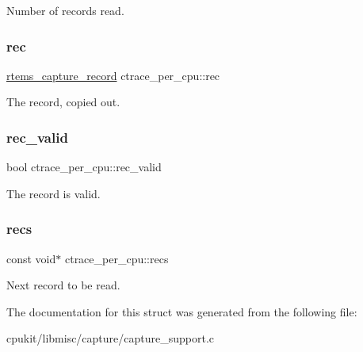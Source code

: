 Number of records read. \mbox{\label{structctrace__per__cpu_a23d0e1fac8bb2448b41de09fa07f5b1c}} 
\subsubsection{\texorpdfstring{rec}{rec}}
{\footnotesize\ttfamily \mbox{\hyperlink{structrtems__capture__record}{rtems\+\_\+capture\+\_\+record}} ctrace\+\_\+per\+\_\+cpu\+::rec}

The record, copied out. \mbox{\label{structctrace__per__cpu_a15bfce7ed37b3471213d39d3c6576d08}} 
\subsubsection{\texorpdfstring{rec\_valid}{rec\_valid}}
{\footnotesize\ttfamily bool ctrace\+\_\+per\+\_\+cpu\+::rec\+\_\+valid}

The record is valid. \mbox{\label{structctrace__per__cpu_ac22b798cd7df56f63d667365f11ff2fc}} 
\subsubsection{\texorpdfstring{recs}{recs}}
{\footnotesize\ttfamily const void$\ast$ ctrace\+\_\+per\+\_\+cpu\+::recs}

Next record to be read. 

The documentation for this struct was generated from the following file\+:\begin{DoxyCompactItemize}
\item 
cpukit/libmisc/capture/capture\+\_\+support.\+c\end{DoxyCompactItemize}
